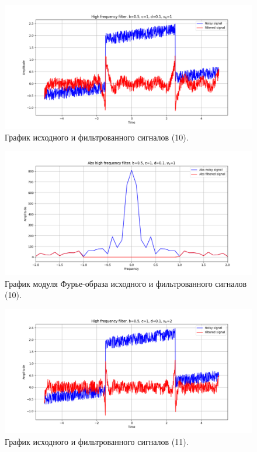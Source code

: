 \documentclass[a4paper, 12pt]{article}
\begin{document}
    \begin{figure}[!htb]
        \centering
        \includegraphics[scale=0.48]{10_u_flt_u_nolow.png}
        \captionsetup{skip=0pt}
        \caption{График исходного и фильтрованного сигналов (10).}
        \label{fig:fig45}
    \end{figure}
    \begin{figure}[!htb]
        \centering
        \includegraphics[scale=0.48]{10_abs_u_U_nolow.png}
        \captionsetup{skip=0pt}
        \caption{График модуля Фурье-образа исходного и фильтрованного сигналов (10).}
        \label{fig:fig46}
    \end{figure}
    \newpage
    \begin{figure}[!htb]
        \centering
        \includegraphics[scale=0.48]{11_u_flt_u_nolow.png}
        \captionsetup{skip=0pt}
        \caption{График исходного и фильтрованного сигналов (11).}
        \label{fig:fig47}
    \end{figure}
\end{document}
